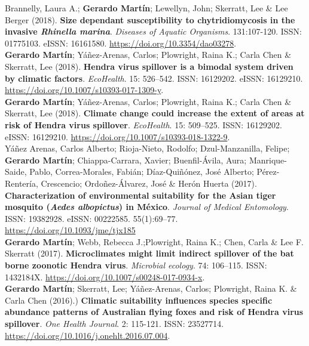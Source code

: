 \documentclass[11pt, letter]{article}
\newcommand{\years}[1]{\marginnote{\scriptsize #1}}
\begin{document}
\years{2018} Brannelly, Laura A.; \textbf{Gerardo Mart\'in}; Lewellyn, John; Skerratt, Lee \& Lee Berger (2018). \textbf{Size dependant susceptibility to chytridiomycosis in the invasive \emph{Rhinella marina}}. \emph{Diseases of Aquatic Organisms}. 131:107-120. ISSN: 01775103. eISSN: 16161580. \url{ https://doi.org/10.3354/dao03278}.\\

\years{2018} \textbf{Gerardo Mart\'in}; Y\'a\~nez-Arenas, Carlos; Plowright, Raina K.; Carla Chen \& Skerratt, Lee (2018). \textbf{Hendra virus spillover is a bimodal system driven by climatic factors}. \emph{EcoHealth}. 15: 526–542. ISSN: 16129202. eISSN: 16129210. \url{https://doi.org/10.1007/s10393-017-1309-y}.\\

\years{2018} \textbf{Gerardo Mart\'in}; Y\'a\~nez-Arenas, Carlos; Plowright, Raina K.; Carla Chen \& Skerratt, Lee (2018). \textbf{Climate change could increase the extent of areas at risk of Hendra virus spillover}. \emph{EcoHealth}. 15: 509–525. ISSN: 16129202. eISSN: 16129210. \url{https://doi.org/10.1007/s10393-018-1322-9}.\\

\years{2017} Y\'a\~nez Arenas, Carlos Alberto; Rioja-Nieto, Rodolfo; Dzul-Manzanilla, Felipe; \textbf{Gerardo Mart\'in}; Chiappa-Carrara, Xavier; Buenfil-\'Avila, Aura; Manrique-Saide, Pablo, Correa-Morales, Fabi\'an; D\'iaz-Qui\~n\'onez, Jos\'e Alberto; P\'erez-Renter\'ia, Crescencio; Ordo\~nez-\'Alvarez, Jos\'e \& Her\'on Huerta (2017). \textbf{Characterization of environmental suitability for the Asian tiger mosquito (\emph{Aedes albopictus}) in M\'exico}. \emph{Journal of Medical Entomology}. ISSN: 19382928. eISSN: 00222585. 55(1):69–77. \url{https://doi.org/10.1093/jme/tjx185}\\

\years{2017} \textbf{Gerardo Mart\'in}; Webb, Rebecca J.;Plowright, Raina K.; Chen, Carla  \& Lee F. Skerratt (2017). \textbf{Microclimates might limit indirect spillover of the bat borne zoonotic Hendra virus}. \emph{Microbial ecology}. 74: 106–115. ISSN: 1432184X. \url{https://doi.org/10.1007/s00248-017-0934-x}.\\

\years{2016} \textbf{Gerardo Mart\'in}; Skerratt, Lee; Y\'a\~nez-Arenas, Carlos; Plowright, Raina K. \& Carla Chen (2016).) \textbf{Climatic suitability influences species specific abundance patterns of Australian flying foxes and risk of Hendra virus spillover}. \emph{One Health Journal}. 2: 115-121. ISSN: 23527714. \url{https://doi.org/10.1016/j.onehlt.2016.07.004}.\\
\end{document}
